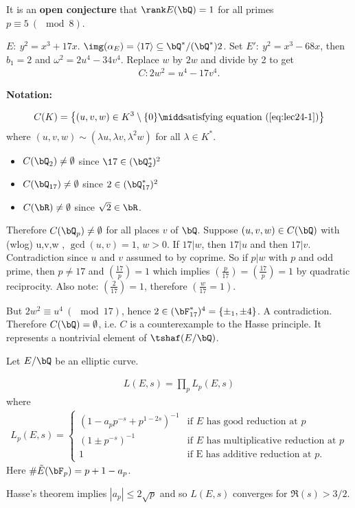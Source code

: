 It is an \textbf{open conjecture} that $\rank E(\bQ) = 1$ for all primes $p \equiv 5 ~ (\mod 8)$.

\begin{example}[Lind]
	$E: ~y^2 = x^3 + 17x$. $\img(\alpha_E) = \langle 17 \rangle\subseteq \bQ^*/(\bQ^*)2$. Set $E':~ y^2 = x^3 - 68x$, then $b_1 = 2$ and $\omega^2 = 2u^4 - 34v^4$. Replace $w$ by $2w$ and divide by 2 to get
	\begin{align*}\label{eq:lec24-1}
		C: 2w^2 = u^4 - 17v^4.
	\end{align*}
\end{example}

\textbf{Notation:} 

\begin{align*}
	C(K) = \left\{(u,v,w) \in K^3 \setminus \{0\} \midd \text{satisfying equation (\ref{eq:lec24-1})}\right\}
\end{align*}
where $(u,v,w) \sim (\lambda u, \lambda v, \lambda^2 w)$ for all $\lambda \in K^*$.
\begin{itemize}
	\item $C(\bQ_2) \neq \emptyset$ since $\17 \in (\bQ_2^*)^2$
	\item $C(\bQ_{17}) \neq \emptyset$ since $2 \in (\bQ_{17}^*)^2$
	\item $C(\bR) \neq \emptyset$ since $\sqrt{2} \in \bR$.
\end{itemize}
Therefore $C(\bQ_p) \neq \emptyset$ for all places $v$ of $\bQ$. Suppose $(u,v,w) \in C(\bQ)$ with (wlog) u,v,w \in \bZ, $\gcd(u,v) = 1$, $w > 0$. If $17 | w$, then $17 | u$ and then $17 | v$. Contradiction since $u$ and $v$ assumed to by coprime. So if $p | w$ with $p$ and odd prime, then $p\neq 17$ and $\left(\frac{17}{p}\right) = 1$ which implies $\left(\frac{p}{17}\right) = \left(\frac{17}{p}\right) = 1$ by quadratic reciprocity. Also note: $\left(\frac{2}{17}\right) = 1$, therefore $\left(\frac{w}{17} = 1\right)$. 

But $2w^2 \equiv u^4 ~(\mod 17)$, hence $2 \in (\bF_{17}^*)^4 = \{\pm_1, \pm 4\}$. A contradiction. Therefore $C(\bQ) = \emptyset$, i.e. $C$ is a counterexample to the Hasse principle. It represents a nontrivial element of $\tshaf(E/\bQ)$.

Let $E/\bQ$ be an elliptic curve.
\begin{defn}\label{defn:lec24-1}
	\begin{align*}
		L(E,s) = \prod_p L_p(E,s)
	\end{align*}
	where
	\begin{align*}
		L_p(E,s) = 
		\begin{cases}
			\left(1 - a_p p^{-s} + p^{1 - 2s}\right)^{-1} & \text{if $E$ has good reduction at $p$} \\
			(1 \pm p^{-s})^{-1} & \text{if $E$ has multiplicative reduction at $p$} \\
			1 & \text{if E has additive reduction at $p$}.
		\end{cases}
	\end{align*}
	Here $\# \tilde{E}(\bF_p) = p+1 - a_p$.
\end{defn}
Hasse's theorem implies $|a_p| \leq 2\sqrt{p}$ and so $L(E,s)$ converges for $\Re(s) > 3/2.$

